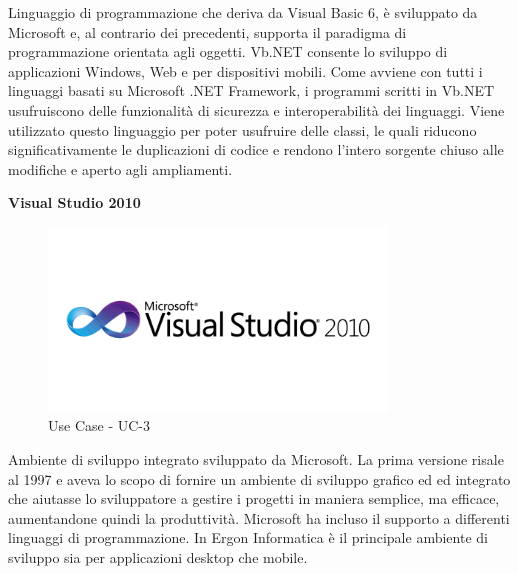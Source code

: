 Linguaggio di programmazione che deriva da Visual Basic 6, è sviluppato da Microsoft e, al contrario dei precedenti, supporta il paradigma di programmazione orientata agli oggetti.
Vb.NET consente lo sviluppo di applicazioni Windows, Web e per dispositivi mobili. 
Come avviene con tutti i linguaggi basati su Microsoft .NET Framework,
i programmi scritti in Vb.NET usufruiscono delle funzionalità di sicurezza e interoperabilità dei linguaggi.
Viene utilizzato questo linguaggio per poter usufruire delle classi, le quali riducono significativamente le duplicazioni di codice e rendono l'intero sorgente 
chiuso alle modifiche e aperto agli ampliamenti.

\textbf{Visual Studio 2010}

\begin{figure}[H]
	\includegraphics[width=9cm]{immagini/microsoft-visual-studio-2010-logo.png}
	\centering
	\caption{Use Case - UC-3}
\end{figure}

Ambiente di sviluppo integrato sviluppato da Microsoft. 
La prima versione risale al 1997 e aveva lo scopo di fornire
un ambiente di sviluppo grafico ed  ed integrato che aiutasse lo sviluppatore a gestire i progetti in maniera semplice, ma efficace, aumentandone quindi la produttività.
Microsoft ha incluso il supporto a differenti linguaggi di programmazione.
In Ergon Informatica è il principale ambiente di sviluppo sia per applicazioni desktop che mobile.
